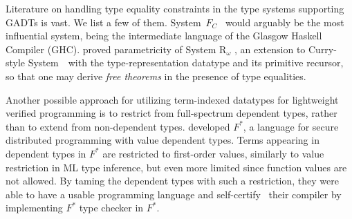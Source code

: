 Literature on handling type equality constraints in the type systems supporting
GADTs is vast. We list a few of them. System~$F_{\!C}$~\cite{Sulzmann07} would
arguably be the most influential system, being the intermediate language of
the Glasgow Haskell Compiler (GHC). \citet{VytWei10} proved parametricity of
System $\mathrm{R}_\omega$ \cite{Crary98}, an extension to Curry-style
System~\Fw\ with the type-representation datatype and its primitive recursor,
so that one may derive \emph{free theorems} \cite{Wadler89free}
in the presence of type equalities.

Another possible approach for utilizing term-indexed datatypes for lightweight
verified programming is to restrict from full-spectrum dependent types, rather
than to extend from non-de\-pend\-ent types. \citet{Swamy11} developed $F^{*}$,
a language for secure distributed programming with value dependent types.
Terms appearing in dependent types in $F^{*}$ are restricted to first-order
values, similarly to value restriction in ML type inference, but even more
limited since function values are not allowed. By taming the dependent types
with such a restriction, they were able to have a usable programming language
and self-certify~\cite{Strub12} their compiler by implementing $F^{*}$
type checker in $F^{*}$.

